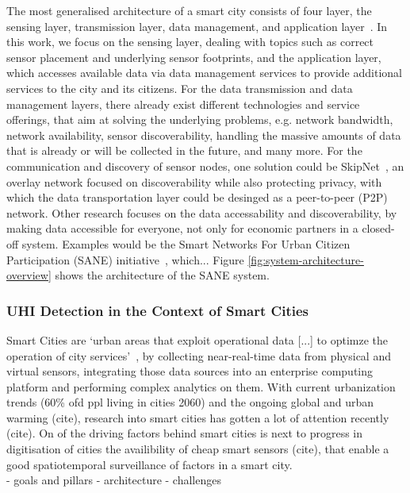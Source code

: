 The most generalised architecture of a smart city consists of four layer, the sensing layer, transmission layer, data management, and application layer~\cite{silva2018towards}. In this work, we focus on the sensing layer, dealing with topics such as correct sensor placement and underlying sensor footprints, and the application layer, which accesses available data via data management services to provide additional services to the city and its citizens. For the data transmission and data management layers, there already exist different technologies and service offerings, that aim at solving the underlying problems, e.g. network bandwidth, network availability, sensor discoverability, handling the massive amounts of data that is already or will be collected in the future, and many more. For the communication and discovery of sensor nodes, one solution could be SkipNet~\cite{harvey2002skipnet}, an overlay network focused on discoverability while also protecting privacy, with which the data transportation layer could be desinged as a peer-to-peer (P2P) network. Other research focuses on the data accessability and discoverability, by making data accessible for everyone, not only for economic partners in a closed-off system. Examples would be the Smart Networks For Urban Citizen Participation (SANE) initiative~\cite{bornholdt2019sane}, which... Figure \ref{fig:system-architecture-overview} shows the architecture of the SANE system.

\subsubsection{UHI Detection in the Context of Smart Cities}

Smart Cities are `urban areas that exploit operational data [...] to optimze the operation of city services'~\cite{harrison2010foundations}, by collecting near-real-time data from physical and virtual sensors, integrating those data sources into an enterprise computing platform and performing complex analytics on them. With current urbanization trends (60\% ofd ppl living in cities 2060) and the ongoing global and urban warming (cite), research into smart cities has gotten a lot of attention recently (cite). On of the driving factors behind smart cities is next to progress in digitisation of cities the availibility of cheap smart sensors (cite), that enable a good spatiotemporal surveillance of factors in a smart city.\\
- goals and pillars
- architecture
- challenges

